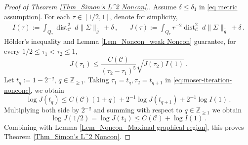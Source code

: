 \documentclass[11pt, letterpaper, reqno]{amsart}
\numberwithin{equation}{section}
\theoremstyle{remark}
\newcommand{\ZZ}{\mathbb{Z}}
\newcommand{\cC}{\mathcal{C}}
\newcommand{\dist}{\operatorname{dist}}
\begin{document}
   \begin{proof}[Proof of Theorem \ref{Thm_Simon's L^2 Noncon}.]
     Assume $\delta \leq \delta_1$ in \eqref{eq metric assumption}. For each $\tau\in [1/2, 1]$, denote for simplicity, 
     \begin{align*}
       I(\tau):= \int_{Q_\tau} \dist_\cC^2\ d\|\Sigma\|_{\bar g} \ + \delta\,, & & 
       J(\tau):= \int_{Q_\tau} r^{-2}\dist_\cC^2\ d\|\Sigma\|_{\bar g} \ +\delta \,. 
     \end{align*}
     H\"older's inequality and Lemma \ref{Lem_Noncon_weak Noncon} guarantee, for every $1/2\leq \tau_1 < \tau_2\leq 1$,
     \begin{equation}\label{eq:moser-iteration-nonconc}
       J(\tau_1) \leq \frac{C(\cC)}{(\tau_2-\tau_1)^5}\sqrt{J(\tau_2)I(1)} \,.
     \end{equation}
     Let $t_q:= 1-2^{-q}$, $q\in \ZZ_{\geq 1}$. 
     Taking $\tau_1 =t_q,\tau_2=t_{q+1}$ in \eqref{eq:moser-iteration-nonconc}, we obtain \[
       \log J(t_q) \leq C(\cC)(1+q) + 2^{-1}\log J(t_{q+1}) + 2^{-1}\log I(1) \,.
     \]
     Multiplying both side by $2^{-q}$ and summing with respect to $q\in \ZZ_{\geq 1}$ we obtain \[
       \log J(1/2) = \log J(t_1) \leq C(\cC) + \log I(1) \,.
     \]
     Combining with Lemma \ref{Lem_Noncon_Maximal graphical region}, this proves Theorem \ref{Thm_Simon's L^2 Noncon}.
   \end{proof}




\end{document}
